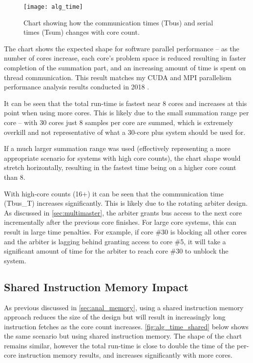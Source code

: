 \begin{figure}[h]
\centering
\texttt{[image: alg\_time]}
\caption{Chart showing how the communication times (Tbus) and serial times (Tsum) changes with core count.}
\label{fig:alg_time}
\end{figure}

The chart shows the expected shape for software parallel performance -- as the number of cores increase, each core's problem space is reduced resulting in faster completion of the summation part, and an increasing amount of time is spent on thread communication. This result matches my CUDA and MPI parallelism performance analysis results conducted in 2018 \cite{soft354}.

It can be seen that the total run-time is fastest near 8 cores and increases at this point when using more cores. This is likely due to the small summation range per core -- with 30 cores just 8 samples per core are summed, which is extremely overkill and not representative of what a 30-core plus system should be used for.

If a much larger summation range was used (effectively representing a more appropriate scenario for systems with high core counts), the chart shape would stretch horizontally, resulting in the fastest time being on a higher core count than 8.

With high-core counts (16+) it can be seen that the communication time (Tbus\_T) increases significantly. This is likely due to the rotating arbiter design. As discussed in \cref{sec:multimaster}, the arbiter grants bus access to the next core incrementally after the previous core finishes. For large core systems, this can result in large time penalties. For example, if core \#30 is blocking all other cores and the arbiter is lagging behind granting access to core \#5, it will take a significant amount of time for the arbiter to reach core \#30 to unblock the system.

\subsection{Shared Instruction Memory Impact}
As previous discussed in \cref{sec:anal_memory}, using a shared instruction memory approach reduces the size of the design but will result in increasingly long instruction fetches as the core count increases. \cref{fig:alg_time_shared} below shows the same scenario but using shared instruction memory. The shape of the chart remains similar, however the total run-time is close to double the time of the per-core instruction memory results, and increases significantly with more cores.

